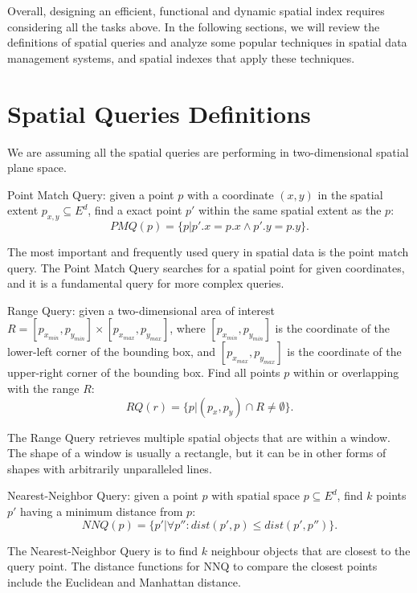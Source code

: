 Overall, designing an efficient, functional and dynamic spatial index requires considering all the tasks above. In the following sections, we will review the definitions of spatial queries and analyze some popular techniques in spatial data management systems, and spatial indexes that apply these techniques. 




\section{Spatial Queries Definitions}
We are assuming all the spatial queries are performing in two-dimensional spatial plane space. 

\begin{query}\label{def:pmq}
Point Match Query: given a point $p$ with a coordinate $(x, y)$ in the spatial extent ${p_{x, y}} \subseteq {E^d}$, find a exact point $p'$ within the same spatial extent as the $p$:
\[PMQ(p) = \{p|p'.x = p.x \land p'.y = p.y\}.\]
\end{query}

The most important and frequently used query in spatial data is the point match query. The Point Match Query searches for a spatial point for given coordinates, and it is a fundamental query for more complex queries.

\begin{query}\label{def:rq}
Range Query: given a two-dimensional area of interest $R = [p_{x_{min}}, p_{y_{min}}] \times [p_{x_{max}}, p_{y_{max}}]$, where $[p_{x_{min}}, p_{y_{min}}]$ is the coordinate of the lower-left corner of the bounding box, and $[p_{x_{max}}, p_{y_{max}}]$ is the coordinate of the upper-right corner of the bounding box. Find all points $p$ within or overlapping with the range $R$:
\[RQ(r) = \{p|(p_x, p_y) \cap R \neq \emptyset\}.\]
\end{query}

The Range Query retrieves multiple spatial objects that are within a window. The shape of a window is usually a rectangle, but it can be in other forms of shapes with arbitrarily unparalleled lines.

\begin{query}\label{def:nnq}
Nearest-Neighbor Query: given a point $p$ with spatial space $p\subseteq{E^d}$, find $k$ points $p'$ having a minimum distance from $p$:
\[NNQ(p) = \{p'|\forall p'':dist(p', p) \leq dist(p', p'')\}.\]
\end{query}

The Nearest-Neighbor Query is to find $k$ neighbour objects that are closest to the query point.  The distance functions for NNQ to compare the closest points include the Euclidean and Manhattan distance. 



